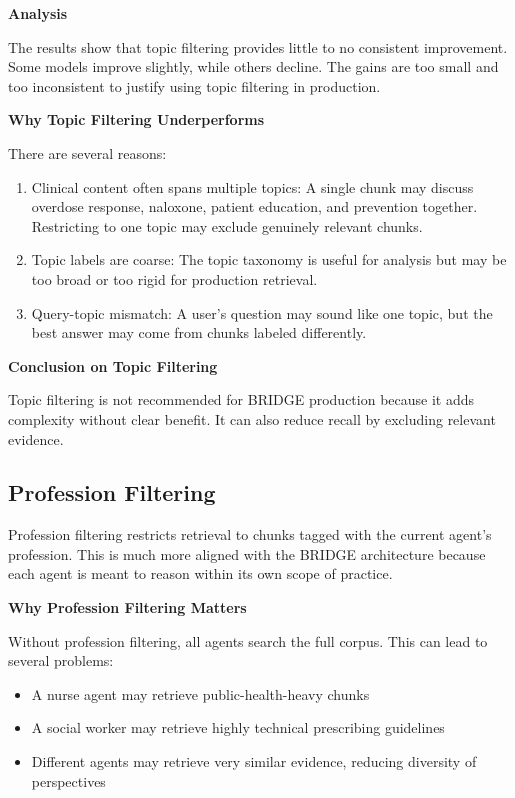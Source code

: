 \documentclass[12pt]{article}
\begin{document}
\textbf{Analysis}

The results show that topic filtering provides little to no consistent improvement. Some models improve slightly, while others decline. The gains are too small and too inconsistent to justify using topic filtering in production.

\textbf{Why Topic Filtering Underperforms}

There are several reasons:

\begin{enumerate}[leftmargin=1.5em]
    \item Clinical content often spans multiple topics: A single chunk may discuss overdose response, naloxone, patient education, and prevention together. Restricting to one topic may exclude genuinely relevant chunks.
    \item Topic labels are coarse: The topic taxonomy is useful for analysis but may be too broad or too rigid for production retrieval.
    \item Query-topic mismatch: A user's question may sound like one topic, but the best answer may come from chunks labeled differently.
\end{enumerate}

\textbf{Conclusion on Topic Filtering}

Topic filtering is not recommended for BRIDGE production because it adds complexity without clear benefit. It can also reduce recall by excluding relevant evidence.

\subsection{Profession Filtering}

Profession filtering restricts retrieval to chunks tagged with the current agent's profession. This is much more aligned with the BRIDGE architecture because each agent is meant to reason within its own scope of practice.

\textbf{Why Profession Filtering Matters}

Without profession filtering, all agents search the full corpus. This can lead to several problems:

\begin{itemize}[leftmargin=1.5em]
    \item A nurse agent may retrieve public-health-heavy chunks
    \item A social worker may retrieve highly technical prescribing guidelines
    \item Different agents may retrieve very similar evidence, reducing diversity of perspectives
\end{itemize}
\end{document}
